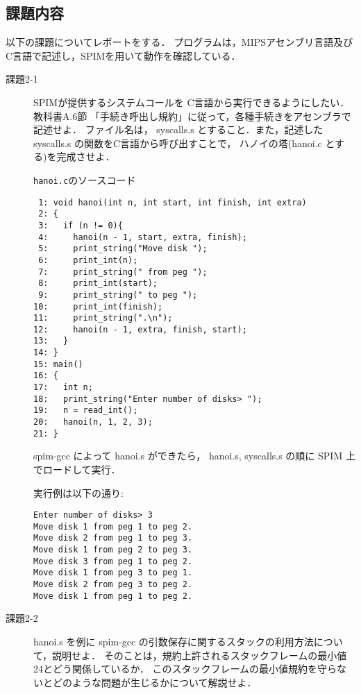 \documentclass[a4j,11pt]{jarticle}
\begin{document}
\subsection{課題内容}\label{sec:kadai}
以下の課題についてレポートをする． プログラムは，MIPSアセンブリ言語及びC言語で記述し，SPIMを用いて動作を確認している．
\begin{description}

\item[課題2-1]  SPIMが提供するシステムコールを C言語から実行できるようにしたい． 教科書A.6節 「手続き呼出し規約」に従って，各種手続きをアセンブラで記述せよ． ファイル名は， syscalls.s とすること．また，記述した syscalls.s の関数をC言語から呼び出すことで， ハノイの塔(hanoi.c とする)を完成させよ． 

\verb|hanoi.c|のソースコード
\begin{verbatim}
 1: void hanoi(int n, int start, int finish, int extra)
 2: {
 3:   if (n != 0){
 4:     hanoi(n - 1, start, extra, finish);
 5:     print_string("Move disk ");
 6:     print_int(n);
 7:     print_string(" from peg ");
 8:     print_int(start);
 9:     print_string(" to peg ");
10:     print_int(finish);
11:     print_string(".\n");
12:     hanoi(n - 1, extra, finish, start);
13:   }
14: }
15: main()
16: {
17:   int n;
18:   print_string("Enter number of disks> ");
19:   n = read_int();
20:   hanoi(n, 1, 2, 3);
21: }
\end{verbatim}
spim-gcc によって hanoi.s ができたら， hanoi.s, syscalls.s の順に SPIM 上でロードして実行．

実行例は以下の通り:
\begin{verbatim}
Enter number of disks> 3
Move disk 1 from peg 1 to peg 2.
Move disk 2 from peg 1 to peg 3.
Move disk 1 from peg 2 to peg 3.
Move disk 3 from peg 1 to peg 2.
Move disk 1 from peg 3 to peg 1.
Move disk 2 from peg 3 to peg 2.
Move disk 1 from peg 1 to peg 2.
\end{verbatim} 

\item[課題2-2]hanoi.s を例に spim-gcc の引数保存に関するスタックの利用方法について，説明せよ． そのことは，規約上許されるスタックフレームの最小値24とどう関係しているか． このスタックフレームの最小値規約を守らないとどのような問題が生じるかについて解説せよ．


\end{description}
\end{document}
